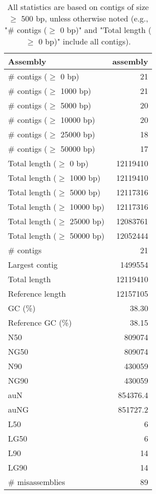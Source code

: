 \documentclass[12pt,a4paper]{article}
\begin{document}
\begin{table}[ht]
\begin{center}
\caption{All statistics are based on contigs of size $\geq$ 500 bp, unless otherwise noted (e.g., "\# contigs ($\geq$ 0 bp)" and "Total length ($\geq$ 0 bp)" include all contigs).}
\begin{tabular}{|l*{1}{|r}|}
\hline
Assembly & assembly \\ \hline
\# contigs ($\geq$ 0 bp) & 21 \\ \hline
\# contigs ($\geq$ 1000 bp) & 21 \\ \hline
\# contigs ($\geq$ 5000 bp) & 20 \\ \hline
\# contigs ($\geq$ 10000 bp) & 20 \\ \hline
\# contigs ($\geq$ 25000 bp) & 18 \\ \hline
\# contigs ($\geq$ 50000 bp) & 17 \\ \hline
Total length ($\geq$ 0 bp) & 12119410 \\ \hline
Total length ($\geq$ 1000 bp) & 12119410 \\ \hline
Total length ($\geq$ 5000 bp) & 12117316 \\ \hline
Total length ($\geq$ 10000 bp) & 12117316 \\ \hline
Total length ($\geq$ 25000 bp) & 12083761 \\ \hline
Total length ($\geq$ 50000 bp) & 12052444 \\ \hline
\# contigs & 21 \\ \hline
Largest contig & 1499554 \\ \hline
Total length & 12119410 \\ \hline
Reference length & 12157105 \\ \hline
GC (\%) & 38.30 \\ \hline
Reference GC (\%) & 38.15 \\ \hline
N50 & 809074 \\ \hline
NG50 & 809074 \\ \hline
N90 & 430059 \\ \hline
NG90 & 430059 \\ \hline
auN & 854376.4 \\ \hline
auNG & 851727.2 \\ \hline
L50 & 6 \\ \hline
LG50 & 6 \\ \hline
L90 & 14 \\ \hline
LG90 & 14 \\ \hline
\# misassemblies & 89 \\ \hline

\end{tabular}
\end{center}
\end{table}
\end{document}
